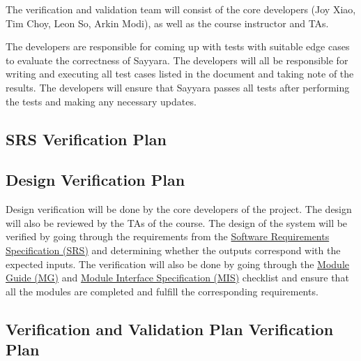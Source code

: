 \documentclass[12pt, titlepage]{article}
\begin{document}
The verification and validation team will consist of the core developers (Joy Xiao, Tim Choy, Leon
So, Arkin Modi), as well as the course instructor and TAs.

The developers are responsible for coming up with tests with suitable edge cases to evaluate the
correctness of Sayyara. The developers will all be responsible for writing and executing all test
cases listed in the document and taking note of the results. The developers will ensure that
Sayyara passes all tests after performing the tests and making any necessary updates.

\subsection{SRS Verification Plan}



\subsection{Design Verification Plan}

Design verification will be done by the core developers of the project. The design will also be
reviewed by the TAs of the course. The design of the system will be verified by going through the
requirements from the
\href{https://github.com/arkinmodi/project-sayyara/blob/main/docs/SRS/SRS.pdf}{Software
	Requirements Specification (SRS)} and determining whether the outputs correspond with the expected
inputs. The verification will also be done by going through the
\href{https://github.com/arkinmodi/project-sayyara/blob/main/docs/Design/MG/MG.pdf}{Module Guide
	(MG)} and
\href{https://github.com/arkinmodi/project-sayyara/blob/main/docs/Design/MIS/MIS.pdf}{Module
	Interface Specification (MIS)} checklist and ensure that all the modules are completed and fulfill
the corresponding requirements.

\subsection{Verification and Validation Plan Verification Plan}

\end{document}
